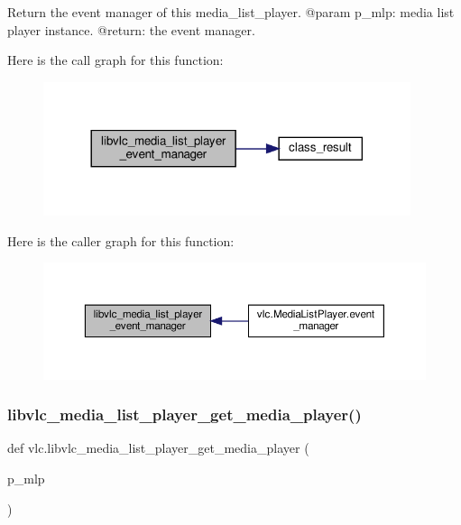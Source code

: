 \begin{DoxyVerb}Return the event manager of this media_list_player.
@param p_mlp: media list player instance.
@return: the event manager.
\end{DoxyVerb}
 Here is the call graph for this function\+:
\nopagebreak
\begin{figure}[H]
\begin{center}
\leavevmode
\includegraphics[width=305pt]{namespacevlc_ace48e0ef2379ca0f1fbdbefdcc251cfe_cgraph}
\end{center}
\end{figure}
Here is the caller graph for this function\+:
\nopagebreak
\begin{figure}[H]
\begin{center}
\leavevmode
\includegraphics[width=350pt]{namespacevlc_ace48e0ef2379ca0f1fbdbefdcc251cfe_icgraph}
\end{center}
\end{figure}
\mbox{\label{namespacevlc_a2da962bb3cca726aa13428060f11e7e8}} 
\subsubsection{\texorpdfstring{libvlc\+\_\+media\+\_\+list\+\_\+player\+\_\+get\+\_\+media\+\_\+player()}{libvlc\_media\_list\_player\_get\_media\_player()}}
{\footnotesize\ttfamily def vlc.\+libvlc\+\_\+media\+\_\+list\+\_\+player\+\_\+get\+\_\+media\+\_\+player (\begin{DoxyParamCaption}\item[{}]{p\+\_\+mlp }\end{DoxyParamCaption})}

